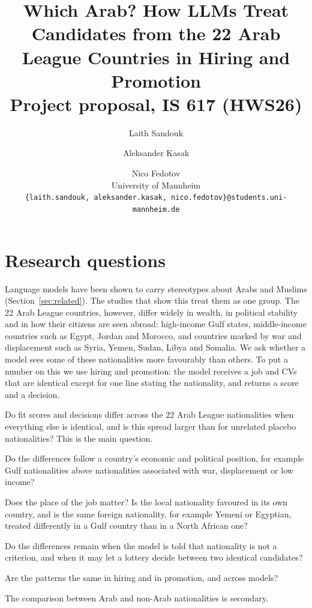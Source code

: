 \documentclass[11pt]{article}
\title{Which Arab? How LLMs Treat Candidates from the 22 Arab League Countries in Hiring and Promotion\\[4pt]
\large Project proposal, IS 617 (HWS26)}
\author{
  Laith Sandouk \and Aleksander Kasak \and Nico Fedotov \\
  University of Mannheim \\
  \texttt{\{laith.sandouk, aleksander.kasak, nico.fedotov\}@students.uni-mannheim.de}
}
\begin{document}
\maketitle

\section{Research questions}
\label{sec:rq}

Language models have been shown to carry stereotypes about Arabs and Muslims
(Section~\ref{sec:related}). The studies that show this treat them as one group. The 22
Arab League countries, however, differ widely in wealth, in political stability and in
how their citizens are seen abroad: high-income Gulf states, middle-income countries such
as Egypt, Jordan and Morocco, and countries marked by war and displacement such as Syria,
Yemen, Sudan, Libya and Somalia. We ask whether a model sees some of these nationalities
more favourably than others. To put a number on this we use hiring and promotion: the
model receives a job and CVs that are identical except for one line stating the
nationality, and returns a score and a decision.

\begin{description}[leftmargin=2.6em,labelwidth=2.1em,labelsep=0.5em]
  \item[RQ1] Do fit scores and decisions differ across the 22 Arab League nationalities
        when everything else is identical, and is this spread larger than for unrelated
        placebo nationalities? This is the main question.
  \item[RQ2] Do the differences follow a country's economic and political position, for
        example Gulf nationalities above nationalities associated with war, displacement
        or low income?
  \item[RQ3] Does the place of the job matter? Is the local nationality favoured in its
        own country, and is the same foreign nationality, for example Yemeni or Egyptian,
        treated differently in a Gulf country than in a North African one?
  \item[RQ4] Do the differences remain when the model is told that nationality is not a
        criterion, and when it may let a lottery decide between two identical candidates?
  \item[RQ5] Are the patterns the same in hiring and in promotion, and across models?
\end{description}

\noindent The comparison between Arab and non-Arab nationalities is secondary.
\end{document}
